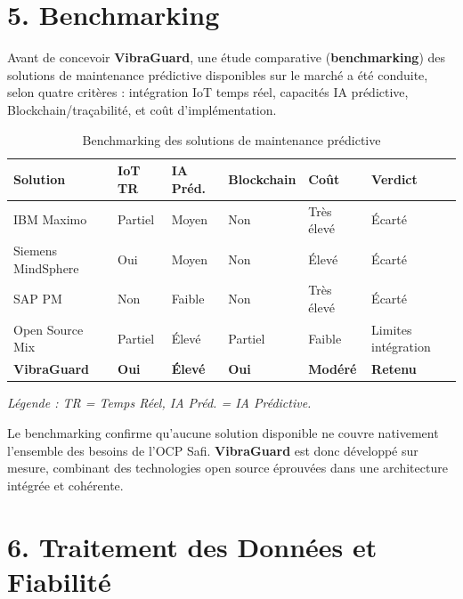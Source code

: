 \documentclass[12pt, a4paper, oneside]{report}
\newcommand{\projectname}{\textbf{VibraGuard}}
\begin{document}
\section*{5. Benchmarking}

Avant de concevoir \projectname{}, une étude comparative (\textbf{benchmarking}) des
solutions de maintenance prédictive disponibles sur le marché a été conduite, selon quatre
critères : intégration IoT temps réel, capacités IA prédictive, Blockchain/traçabilité, et
coût d'implémentation.

\begin{table}[H]
  \centering
  \scriptsize
  \begin{tabularx}{\textwidth}{L{2.2cm} C{2cm} C{2cm} C{2cm} C{2.5cm} L{2cm}}
    \toprule
    \textbf{Solution} &
    \textbf{IoT TR} &
    \textbf{IA Préd.} &
    \textbf{Blockchain} &
    \textbf{Coût} &
    \textbf{Verdict} \\
    \midrule
           IBM Maximo      & Partiel & Moyen  & Non    & Très élevé & Écarté \\
    Siemens MindSphere & Oui  & Moyen  & Non    & Élevé      & Écarté \\
           SAP PM          & Non     & Faible & Non    & Très élevé & Écarté \\
    Open Source Mix & Partiel & Élevé  & Partiel& Faible     & Limites intégration \\
       \textbf{\projectname{}} & \textbf{Oui} & \textbf{Élevé} & \textbf{Oui} & \textbf{Modéré} & \textbf{Retenu} \\
    \bottomrule
  \end{tabularx}
  \caption{Benchmarking des solutions de maintenance prédictive}
\end{table}

\textit{Légende : TR = Temps Réel, IA Préd. = IA Prédictive.}

Le benchmarking confirme qu'aucune solution disponible ne couvre nativement l'ensemble des
besoins de l'OCP Safi. \projectname{} est donc développé sur mesure, combinant des
technologies open source éprouvées dans une architecture intégrée et cohérente.

\section*{6. Traitement des Données et Fiabilité}
\end{document}
